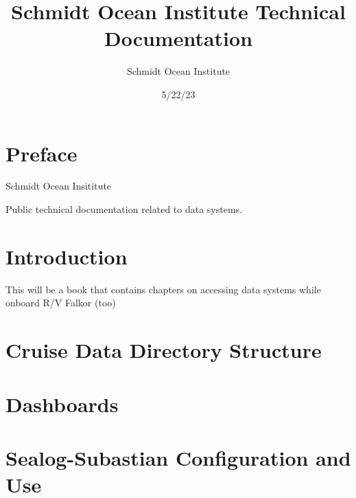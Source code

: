 \documentclass[
  letterpaper,
  DIV=11,
  numbers=noendperiod]{scrreprt}
\title{Schmidt Ocean Institute Technical Documentation}
\author{Schmidt Ocean Institute}
\date{5/22/23}
\renewcommand*\contentsname{Table of contents}
\newcommand\contentsname{Table of contents}
\begin{document}
\maketitle
\ifdefined\Shaded\renewenvironment{Shaded}{\begin{tcolorbox}[borderline west={3pt}{0pt}{shadecolor}, enhanced, breakable, sharp corners, interior hidden, frame hidden, boxrule=0pt]}{\end{tcolorbox}}\fi

\renewcommand*\contentsname{Table of contents}
{
\hypersetup{linkcolor=}
\setcounter{tocdepth}{2}
\tableofcontents
}

\hypertarget{preface}{%
\chapter*{Preface}\label{preface}}


Schmidt Ocean Insititute

Public technical documentation related to data systems.


\hypertarget{introduction}{%
\chapter{Introduction}\label{introduction}}

This will be a book that contains chapters on accessing data systems
while onboard R/V Falkor (too)


\hypertarget{cruise-data-directory-structure}{%
\chapter{Cruise Data Directory
Structure}\label{cruise-data-directory-structure}}


\hypertarget{dashboards}{%
\chapter{Dashboards}\label{dashboards}}


\hypertarget{sealog-subastian-configuration-and-use}{%
\chapter{Sealog-Subastian Configuration and
Use}\label{sealog-subastian-configuration-and-use}}
\end{document}
